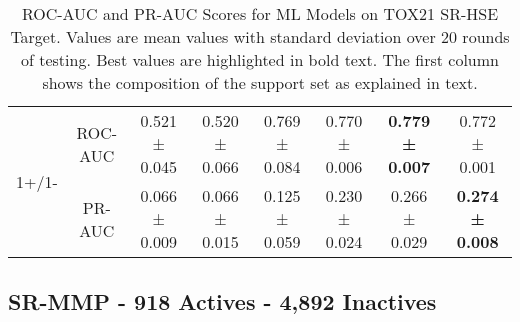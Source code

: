 \begin{table*}[h]
{\begin{tabular}{@{}cccccccc@{}}
\midrule
\multirow{ 2}{*}{1+/1-} & ROC-AUC & 0.521 ± 0.045 & 0.520 ± 0.066 & 0.769 ± 0.084 & 0.770 ± 0.006 & \textbf{0.779 ± 0.007} & 0.772 ± 0.001 \\ & PR-AUC & 0.066 ± 0.009 & 0.066 ± 0.015 & 0.125 ± 0.059 & 0.230 ± 0.024 & 0.266 ± 0.029 & \textbf{0.274 ± 0.008}\\
\bottomrule
\end{tabular}
}
\caption[ROC-AUC and PR-AUC Scores for TOX21 SR-HSE Target.]{ROC-AUC and PR-AUC Scores for ML Models on TOX21 SR-HSE Target. Values are mean values with standard deviation over 20 rounds of testing. Best values are highlighted in bold text. The first column shows the composition of the support set as explained in text.}
\label{table:TOX21-SR-HSE}
\end{table*}

\subsection{SR-MMP - 918 Actives - 4,892 Inactives}
 
